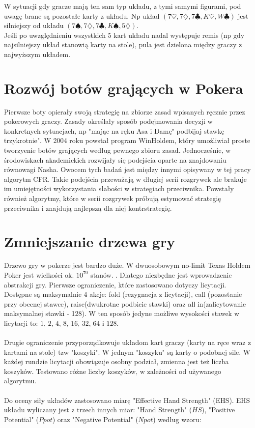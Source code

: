 \documentclass[licencjacka]{pracamgr}
\begin{document}
\noindent
W sytuacji gdy gracze mają ten sam typ układu, z tymi samymi figurami, pod uwagę brane są pozostałe karty z układu. Np
układ $(7\heartsuit, 7\diamondsuit, 7\clubsuit, K\heartsuit, W\clubsuit)$ jest silniejszy od układu
$(7\spadesuit, 7\diamondsuit, 7\clubsuit, K\spadesuit, 5\diamondsuit)$. \\

\noindent
Jeśli po uwzględnieniu wszystkich 5 kart układu nadal występuje remis (np gdy najsilniejszy układ stanowią karty na stole),
pula jest dzielona między graczy z najwyższym układem.

\section{Rozwój botów grających w Pokera}

Pierwsze boty opierały swoją strategię na zbiorze zasad wpisanych ręcznie przez pokerowych graczy. Zasady określały
sposób podejmowania decyzji w konkretnych sytuacjach, np "mając na ręku Asa i Damę" podbijaj stawkę trzykrotnie".
W 2004 roku powstał program WinHoldem, który umożliwiał proste tworzyenie botów grających według pewnego zbioru zasad.
Jednocześnie, w środowiskach akademickich rozwijały się podejścia oparte na znajdowaniu równowagi Nasha. Owocem tych
badań jest między innymi opisywany w tej pracy algorytm CFR. Takie podejścia przeważają w długiej serii rozgrywek ale
brakuje im umiejętności wykorzystania słabości w strategiach przeciwnika. Powstały również algorytmy, które w serii
rozgrywek próbują estymować strategię przeciwnika i znajdują najlepszą dla niej kontrstrategię. \cite{exploit}

\section{Zmniejszanie drzewa gry}

Drzewo gry w pokerze jest bardzo duże. W dwuosobowym no-limit Texas Holdem Poker jest wielkości
ok. $10^{70}$ stanów. \cite{monte-carlo}. Dlatego niezbędne jest wprowadzenie abstrakcji gry.
Pierwsze ograniczenie, które zastosowano dotyczy licytacji. Dostępne są maksymalnie 4 akcje:
fold (rezygnacja z licytacji), call (pozostanie przy obecnej stawce), raise(dwukrotne podbicie stawki) oraz
all in(zalicytowanie maksymalnej stawki - 128). W ten sposób jedyne możliwe wysokości stawek w licytacji to: $1$, $2$,
$4$, $8$, $16$, $32$, $64$ i $128$. \\\\
\noindent
Drugie ograniczenie przyporządkowuje układom kart graczy (karty na ręce wraz z kartami na stole) tzw "koszyki".
W jednym "koszyku" są karty o podobnej sile. W każdej rundzie licytacji obowiązuje osobny podział, zmienna
jest też liczba koszyków. Testowano różne liczby koszyków, w zależności od używanego algorytmu. \\\\
\noindent
Do oceny siły układów zastosowano miarę "Effective Hand Strength" (EHS). EHS układu wyliczany
jest z trzech innych miar: "Hand Strength" ($HS$), "Positive Potential" ($Ppot$) oraz "Negative Potential" ($Npot$) według
wzoru:
\end{document}
